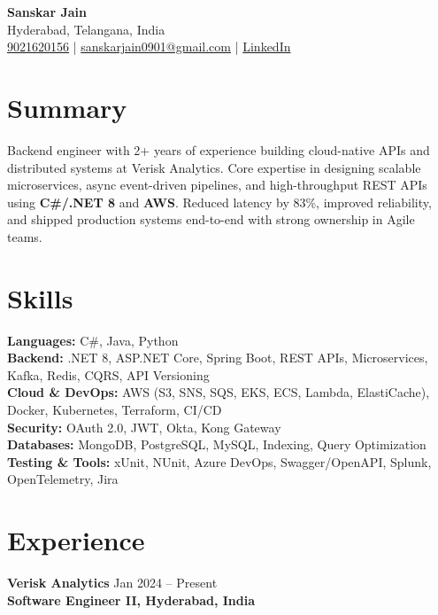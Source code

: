 \documentclass[a4paper,10pt]{article}
\begin{document}
\begin{center}
    {\LARGE \textbf{Sanskar Jain}} \\
    Hyderabad, Telangana, India \\
    \href{tel:9021620156}{9021620156} \;|\;
    \href{mailto:sanskarjain0901@gmail.com}{sanskarjain0901@gmail.com} \;|\;
    \href{https://www.linkedin.com/in/sanskar-jain0901/}{LinkedIn}
\end{center}

\vspace{3pt}

\section*{Summary}
Backend engineer with 2+ years of experience building cloud-native APIs and distributed systems at Verisk Analytics.
Core expertise in designing scalable microservices, async event-driven pipelines, and high-throughput REST APIs using \textbf{C\#/.NET 8} and \textbf{AWS}.
Reduced latency by 83\%, improved reliability, and shipped production systems end-to-end with strong ownership in Agile teams.

\section*{Skills}
\textbf{Languages:} C\#, Java, Python \\
\textbf{Backend:} .NET 8, ASP.NET Core, Spring Boot, REST APIs, Microservices, Kafka, Redis, CQRS, API Versioning \\
\textbf{Cloud \& DevOps:} AWS (S3, SNS, SQS, EKS, ECS, Lambda, ElastiCache), Docker, Kubernetes, Terraform, CI/CD \\
\textbf{Security:} OAuth 2.0, JWT, Okta, Kong Gateway \\
\textbf{Databases:} MongoDB, PostgreSQL, MySQL, Indexing, Query Optimization \\
\textbf{Testing \& Tools:} xUnit, NUnit, Azure DevOps, Swagger/OpenAPI, Splunk, OpenTelemetry, Jira

\section*{Experience}

\textbf{Verisk Analytics} \hfill Jan 2024 -- Present \\
\textbf{Software Engineer II, Hyderabad, India}
\end{document}
